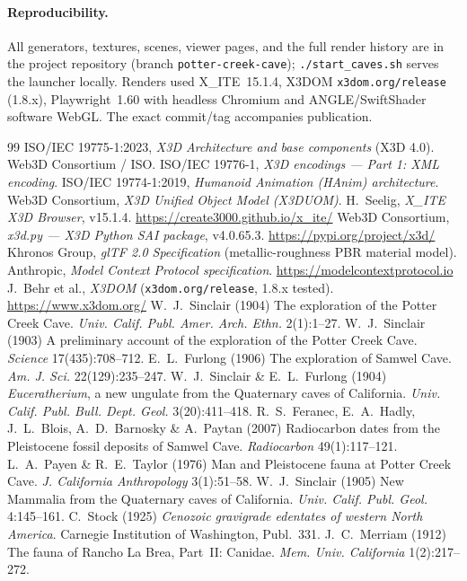 \documentclass[11pt]{article}
\newcommand{\xite}{X\_ITE}
\begin{document}
\paragraph{Reproducibility.} All generators, textures, scenes, viewer pages, and
the full render history are in the project repository (branch
\texttt{potter-creek-cave}); \texttt{./start\_caves.sh} serves the launcher
locally. Renders used \xite{}~15.1.4, X3DOM \texttt{x3dom.org/release} (1.8.x),
Playwright~1.60 with headless Chromium and ANGLE/SwiftShader software WebGL. The
exact commit/tag accompanies publication.

\begin{thebibliography}{99}
\small
{} ISO/IEC 19775-1:2023, \emph{X3D Architecture and base components}
(X3D 4.0). Web3D Consortium / ISO.
 ISO/IEC 19776-1, \emph{X3D encodings --- Part 1: XML encoding}.
 ISO/IEC 19774-1:2019, \emph{Humanoid Animation (HAnim)
architecture}.
 Web3D Consortium, \emph{X3D Unified Object Model (X3DUOM)}.
 H.~Seelig, \emph{\xite{} X3D Browser}, v15.1.4.
\url{https://create3000.github.io/x_ite/}
 Web3D Consortium, \emph{x3d.py --- X3D Python SAI package},
v4.0.65.3. \url{https://pypi.org/project/x3d/}
 Khronos Group, \emph{glTF 2.0 Specification} (metallic-roughness
PBR material model).
 Anthropic, \emph{Model Context Protocol specification}.
\url{https://modelcontextprotocol.io}
 J.~Behr et al., \emph{X3DOM} (\texttt{x3dom.org/release}, 1.8.x
tested). \url{https://www.x3dom.org/}
 W.~J.~Sinclair (1904) The exploration of the Potter Creek
Cave. \emph{Univ. Calif. Publ. Amer. Arch. Ethn.} 2(1):1--27.
 W.~J.~Sinclair (1903) A preliminary account of the
exploration of the Potter Creek Cave. \emph{Science} 17(435):708--712.
 E.~L.~Furlong (1906) The exploration of Samwel Cave.
\emph{Am. J. Sci.} 22(129):235--247.
 W.~J.~Sinclair \& E.~L.~Furlong (1904) \emph{Euceratherium}, a new
ungulate from the Quaternary caves of California. \emph{Univ. Calif. Publ. Bull.
Dept. Geol.} 3(20):411--418.
 R.~S.~Feranec, E.~A.~Hadly, J.~L.~Blois, A.~D.~Barnosky \&
A.~Paytan (2007) Radiocarbon dates from the Pleistocene fossil deposits of Samwel
Cave. \emph{Radiocarbon} 49(1):117--121.
 L.~A.~Payen \& R.~E.~Taylor (1976) Man and Pleistocene fauna at
Potter Creek Cave. \emph{J. California Anthropology} 3(1):51--58.
 W.~J.~Sinclair (1905) New Mammalia from the Quaternary caves
of California. \emph{Univ. Calif. Publ. Geol.} 4:145--161.
 C.~Stock (1925) \emph{Cenozoic gravigrade edentates of western
North America}. Carnegie Institution of Washington, Publ.~331.
 J.~C.~Merriam (1912) The fauna of Rancho La Brea, Part~II:
Canidae. \emph{Mem. Univ. California} 1(2):217--272.
\end{thebibliography}
\end{document}
